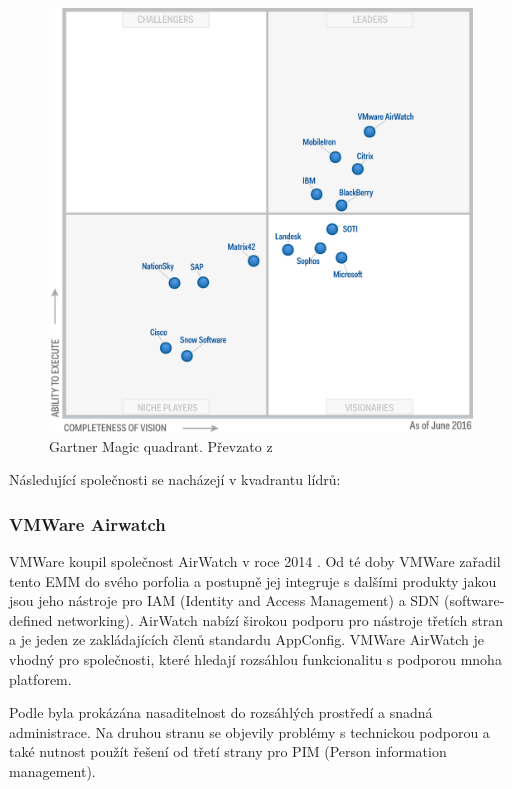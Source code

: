  \begin{figure}[h!]
\includegraphics[width=13cm]{img/Gartner_EMM}
\caption{Gartner Magic quadrant. Převzato z \cite{Gartner_EMM_2016}} 
\label{EMM:quadrant}
\centering
\end{figure}
 
Následující společnosti se nacházejí v kvadrantu lídrů:


\subsubsection{VMWare Airwatch}
VMWare koupil společnost AirWatch v roce 2014 . Od té doby VMWare zařadil tento EMM do svého porfolia a postupně jej integruje s dalšími produkty jakou jsou jeho nástroje pro IAM (Identity and Access Management) a SDN (software-defined networking). AirWatch nabízí širokou podporu pro nástroje třetích stran a je jeden ze zakládajících členů standardu AppConfig. VMWare AirWatch je vhodný pro společnosti, které hledají rozsáhlou funkcionalitu s podporou mnoha platforem.

Podle  byla prokázána nasaditelnost do rozsáhlých prostředí a snadná administrace. Na druhou stranu se objevily problémy s technickou podporou a také nutnost použít řešení od třetí strany pro PIM (Person information management).



